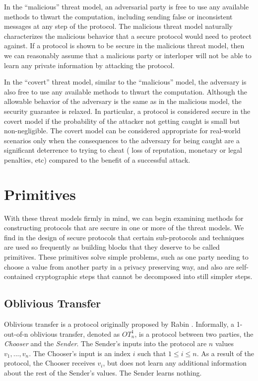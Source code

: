 In the {}``malicious'' threat model, an adversarial party is free
to use any available methods to thwart the computation, including
sending false or inconsistent messages at any step of the protocol.
The malicious threat model naturally characterizes the malicious behavior
that a secure protocol would need to protect against. If a protocol
is shown to be secure in the malicious threat model, then we can reasonably
assume that a malicious party or interloper will not be able to learn
any private information by attacking the protocol.

In the {}``covert'' threat model, similar to the {}``malicious''
model, the adversary is also free to use any available methods to
thwart the computation. Although the allowable behavior of the adversary
is the same as in the malicious model, the security guarantee is relaxed.
In particular, a protocol is considered secure in the covert model
if the probability of the attacker not getting caught is small but
non-negligible. The covert model can be considered appropriate for
real-world scenarios only when the consequences to the adversary for
being caught are a significant deterrence to trying to cheat (\ie
loss of reputation, monetary or legal penalties, etc) compared to
the benefit of a successful attack. \cite{aumannlindell}


\section{Primitives \label{sub:Primitives}}

With these threat models firmly in mind, we can begin examining methods
for constructing protocols that are secure in one or more of the threat
models. We find in the design of secure protocols that certain sub-protocols
and techniques are used so frequently as building blocks that they
deserve to be called primitives. These primitives solve simple problems,
such as one party needing to choose a value from another party in
a privacy preserving way, and also are self-contained cryptographic
steps that cannot be decomposed into still simpler steps.


\subsection{Oblivious Transfer}

Oblivious transfer is a protocol originally proposed by Rabin \cite{Rabin81}.
Informally, a 1-out-of-n oblivious transfer, denoted as $OT_{n}^{1}$,
is a protocol between two parties, the \emph{Chooser} and the \emph{Sender}.
The Sender's inputs into the protocol are $n$ values $v_{1},...,v_{n}$.
The Chooser's input is an index $i$ such that $1\le i\le n$. As
a result of the protocol, the Chooser receives $v_{i}$, but does
not learn any additional information about the rest of the Sender's
values. The Sender learns nothing.

